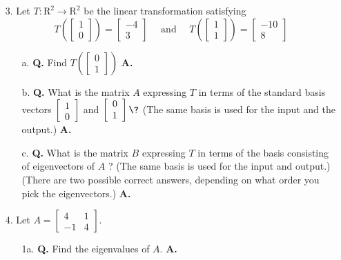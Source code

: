 \documentclass[main.tex]{subfiles}
\begin{document}
\begin{enumerate}
\item[3.] Let $T: \mathrm{R}^{2} \rightarrow \mathrm{R}^{2}$ be the linear transformation satisfying
    $$
    T\left(\left[\begin{array}{l}
    1 \\
    0
    \end{array}\right]\right)=\left[\begin{array}{r}
    -4 \\
    3
    \end{array}\right] \quad \text { and } \quad T\left(\left[\begin{array}{c}
    1 \\
    1
    \end{array}\right]\right)=\left[\begin{array}{c}
    -10 \\
    8
    \end{array}\right]
    $$
    \begin{enumerate}
        \item [a.] \textbf{Q.} Find $T\left(\left[\begin{array}{l}0 \\ 1\end{array}\right]\right)$ \textbf{A.}
        
        \item [b.] \textbf{Q.} What is the matrix $A$ expressing $T$ in terms of the standard basis vectors $\left[\begin{array}{l}1 \\ 0\end{array}\right]$ and $\left[\begin{array}{l}0 \\ 1\end{array}\right] \? $ (The same basis is used for the input and the output.) \textbf{A.}
        
        \item [c.] \textbf{Q.} What is the matrix $B$ expressing $T$ in terms of the basis consisting of eigenvectors of $A$ ? (The same basis is used for the input and output.) (There are two possible correct answers, depending on what order you pick the eigenvectors.) \textbf{A.}
    \end{enumerate}

\item[4.] Let $A=\left[\begin{array}{rr}4 & 1 \\ -1 & 4\end{array}\right]$.
    \begin{enumerate}
    \item [1a.] \textbf{Q.} Find the eigenvalues of $A$. \textbf{A.}
    \end{enumerate}


\end{enumerate}
\end{document}
